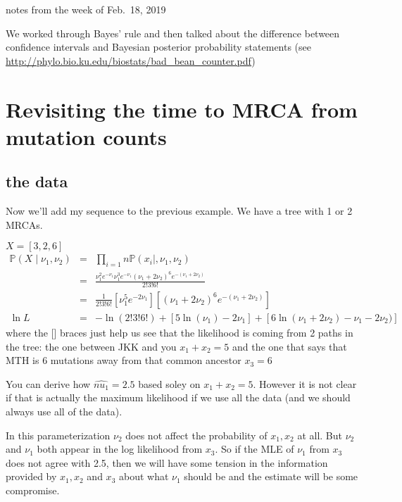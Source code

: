 \documentclass[11pt]{article}
\renewcommand{\Pr}{\mathbb{P}}
\begin{document}
notes from the week of Feb.~18, 2019 \\
\tableofcontents

We worked through Bayes' rule and then talked about the difference
between confidence intervals and Bayesian posterior probability
statements (see \url{http://phylo.bio.ku.edu/biostats/bad_bean_counter.pdf})

\section{Revisiting the time to MRCA from mutation counts}
\subsection{the data}
Now we'll add my sequence to the previous example.
We have a tree with 1 or 2 MRCAs.

$X=[3,2,6]$
\begin{eqnarray}
\Pr(X\mid \nu_1,\nu_2)& = & \prod_{i=1}{n} \Pr(x_i\mid, \nu_1,\nu_2)\\
& = &
 \frac{\nu_1^2e^{-\nu_1}\nu_1^3e^{-\nu_1}\left(\nu_1+2\nu_2\right)^6e^{-(\nu_1+2\nu_2)}}{2!3!6!} \\
& = & \frac{1}{2!3!6!}\left[\nu_1^5e^{-2\nu_1}\right]
\left[\left(\nu_1+2\nu_2\right)^6e^{-(\nu_1+2\nu_2)}\right] \\
\ln L & = & -\ln(2!3!6!)+ \left[5 \ln(\nu_1) -2\nu_1\right] +
\left[6\ln\left(\nu_1+2\nu_2\right) -\nu_1- 2\nu_2)\right] 
\end{eqnarray}
where the [] braces just help us see that the likelihood is coming from 2 paths in the tree: the one between JKK and you $x_1+x_2 = 5$ and the one that says that MTH
is 6 mutations away from that common ancestor $x_3 = 6$

You can derive how $\hat{nu_1}=2.5$ based soley on $x_1+x_2 = 5$.
However it is not clear if that is actually the maximum likelihood
if we use all the data (and we should always use all of the data).

In this parameterization $\nu_2$ does not affect the probability of $x_1, x_2$ at 
all. 
But $\nu_2$ and $\nu_1$ both appear in the log likelihood from $x_3$.
So if the MLE of $\nu_1$ from $x_3$ does not agree with 2.5, then we 
    will have some tension in the information provided by $x_1, x_2$
    and $x_3$ about what $\nu_1$ should be and the estimate will be 
    some compromise.
\end{document}
